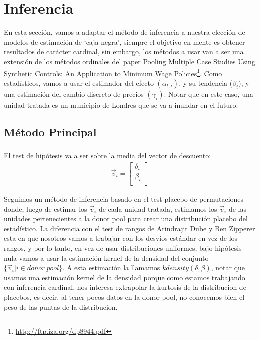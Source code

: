 \documentclass[12pt]{article}
\begin{document}
\section{Inferencia}
\label{sec:Inferencia}

En esta sección, vamos a adaptar el método de inferencia a nuestra elección de modelos de estimación de ‘caja negra’, siempre el objetivo en mente es obtener resultados de carácter cardinal, sin embargo, los métodos a usar van a ser una extensión de los métodos ordinales del paper Pooling Multiple Case Studies Using Synthetic Controls: An Application to Minimum Wage Policies\footnote{\url{http://ftp.iza.org/dp8944.pdf}}. 
Como estadísticos, vamos a usar el estimador del efecto {$(\alpha_{t,i})$}, y su tendencia ({$\beta_i$}), y una estimación del cambio discreto de precios {$(\gamma_i)$}. Notar que en este caso, una unidad tratada es un municipio de Londres que se va a inundar en el futuro.

\subsection{Método Principal}
\subsubsection{}
El test de hipótesis va a ser sobre la media del vector de descuento:
\begin{align*}
    {\vec{v}}_i=\left[\begin{matrix}\delta_i\\\beta_i\\\end{matrix}\right]
\end{align*}

Seguimos un método de inferencia basado en el test placebo de permutaciones donde, luego de estimar los {${\vec{v}}_i$} de cada unidad tratada, estimamos los {$ {\vec{v}}_i $} de las unidades pertenecientes a la donor pool para crear una distribución placebo del estadístico. La diferencia con el test de rangos de Arindrajit Dube y Ben Zipperer esta en que nosotros vamos a trabajar con los desvíos estándar en vez de los rangos, y por lo tanto, en vez de usar distribuciones uniformes, bajo hipótesis nula vamos a usar la estimación kernel de la densidad del conjunto {$ \{{\vec{v}}_i|i\in donor\ pool\} $}. A esta estimación la llamamos {$kdensity(\delta,\beta)$}, notar que usamos una estimación kernel de la densidad porque como estamos trabajando con inferencia cardinal, nos interesa extrapolar la kurtosis de la distribucion de placebos, es decir, al tener pocos datos en la donor pool, no conocemos bien el peso de las puntas de la distribucion. 
\end{document}
